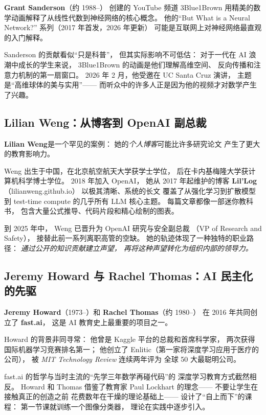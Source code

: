 \textbf{Grant Sanderson}（约 1988--）
创建的 YouTube 频道 3Blue1Brown
用精美的数学动画解释了从线性代数到神经网络的核心概念。
他的``But What is a Neural Network?'' 系列（2017 年首发，2026 年更新）
可能是互联网上对神经网络最直观的入门解释。

Sanderson 的贡献看似``只是科普''，
但其实际影响不可低估：
对于一代在 AI 浪潮中成长的学生来说，
3Blue1Brown 的动画是他们理解高维空间、
反向传播和注意力机制的第一扇窗口。
2026 年 2 月，他受邀在 UC Santa Cruz 演讲，
主题是``高维球体的美与实用''——
而听众中的许多人正是因为他的视频才对数学产生了兴趣。

\subsection{Lilian Weng：从博客到 OpenAI 副总裁}

\textbf{Lilian Weng}是一个罕见的案例：
她的\emph{个人博客}可能比许多研究论文
产生了更大的教育影响力。

Weng 出生于中国，在北京航空航天大学获学士学位，
后在卡内基梅隆大学获计算机科学博士学位。
2018 年加入 OpenAI，
她从 2017 年起维护的博客 \textbf{Lil'Log}
（lilianweng.github.io）
以极其清晰、系统的长文
覆盖了从强化学习到扩散模型到
test-time compute 的几乎所有 LLM 核心主题。
每篇文章都像一部迷你教科书，
包含大量公式推导、代码片段和精心绘制的图表。

到 2025 年中，
Weng 已晋升为 OpenAI 研究与安全副总裁
（VP of Research and Safety），
接替此前一系列离职高管的空缺。
她的轨迹体现了一种独特的职业路径：
\emph{通过公开的知识贡献建立声望，
再将这种声望转化为组织内部的领导力。}

\subsection{Jeremy Howard 与 Rachel Thomas：AI 民主化的先驱}

\textbf{Jeremy Howard}（1973--）和
\textbf{Rachel Thomas}（约 1980--）
在 2016 年共同创立了 \textbf{fast.ai}，
这是 AI 教育史上最重要的项目之一。

Howard 的背景非同寻常：
他曾是 Kaggle 平台的总裁和首席科学家，
两次获得国际机器学习竞赛排名第一；
他创立了 Enlitic（第一家将深度学习应用于医疗的公司），
被 \emph{MIT Technology Review} 连续两年评为
全球 50 大最聪明公司。

fast.ai 的哲学与当时主流的``先学三年数学再碰代码''的
深度学习教育方式截然相反。
Howard 和 Thomas 借鉴了教育家 Paul Lockhart 的理念——
不要让学生在接触真正的创造之前
花费数年在干燥的理论基础上——
设计了``自上而下''的课程：
第一节课就训练一个图像分类器，
理论在实践中逐步引入。

